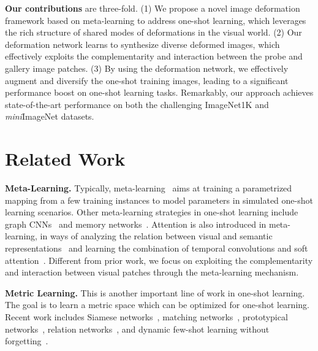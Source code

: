 \documentclass[10pt,letterpaper,twocolumn]{article}
\begin{document}
\textbf{Our contributions} are three-fold. (1) We propose a novel
image deformation framework based on meta-learning to address one-shot
learning, which leverages the rich structure of shared modes of deformations
in the visual world. (2) Our deformation network learns to synthesize diverse deformed images, which effectively exploits the
complementarity and interaction between the probe and gallery image
patches. (3) By using the deformation network, we effectively augment
and diversify the one-shot training images, leading to a significant
performance boost on one-shot learning tasks. Remarkably, our approach
achieves state-of-the-art performance on both the challenging
ImageNet1K and \emph{mini}ImageNet datasets.




\section{Related Work}



\noindent \textbf{Meta-Learning.} Typically, meta-learning~\cite{Thrun1998,Thrun96learningto,schmidhuber1987evolutionary,matchingnet_1shot,yuxiong2016NeurIPS,wang2016learningfrom,prototype_network,wang2017learning,Sachin2017,MAML,meta-sgd,DEML+Meta-SGD,MetaNetwork} aims at training a parametrized mapping from a few training instances
to model parameters in simulated one-shot learning scenarios.
Other meta-learning strategies in one-shot learning include graph CNNs~\cite{2017arXiv171104043G} and memory networks~\cite{deep_1shot_recent,memorymatching}. Attention is also introduced in meta-learning, in ways of analyzing the
relation between visual and semantic representations~\cite{multiAttention} and
learning the combination of temporal convolutions and soft attention~\cite{SNAIL}. Different from prior work,
we focus on exploiting the complementarity
and interaction between visual patches through the meta-learning mechanism.

\noindent \textbf{Metric Learning.} This is another important line of work in one-shot learning. The goal is to learn
a metric space which can be optimized for one-shot learning. Recent
work includes Siamese networks~\cite{siamese_1shot}, matching
networks~\cite{matchingnet_1shot}, prototypical networks~\cite{prototype_network}, relation
networks~\cite{relation_net}, and dynamic few-shot learning without forgetting~\cite{dym}.
\end{document}
